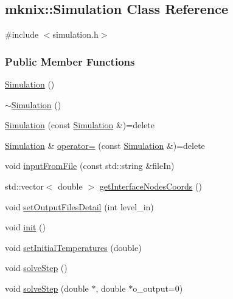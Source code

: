 \hypertarget{classmknix_1_1_simulation}{}\subsection{mknix\+:\+:Simulation Class Reference}
\label{classmknix_1_1_simulation}


{\ttfamily \#include $<$simulation.\+h$>$}

\subsubsection*{Public Member Functions}
\begin{DoxyCompactItemize}
\item 
\hyperlink{classmknix_1_1_simulation_a8741379faa5cd9695a9dc4f9be3fdc11}{Simulation} ()
\item 
\hyperlink{classmknix_1_1_simulation_a8ab58ea5b4557c72b2a8f00cb8ef3e75}{$\sim$\+Simulation} ()
\item 
\hyperlink{classmknix_1_1_simulation_a1cc519c483f9daf0beb92a2fdf2e6066}{Simulation} (const \hyperlink{classmknix_1_1_simulation}{Simulation} \&)=delete
\item 
\hyperlink{classmknix_1_1_simulation}{Simulation} \& \hyperlink{classmknix_1_1_simulation_ae91beee48577801b40aabb3a766c9241}{operator=} (const \hyperlink{classmknix_1_1_simulation}{Simulation} \&)=delete
\item 
void \hyperlink{classmknix_1_1_simulation_a7a8132d3b1ac9f76442d431c636966e3}{input\+From\+File} (const std\+::string \&file\+In)
\item 
std\+::vector$<$ double $>$ \hyperlink{classmknix_1_1_simulation_a8a1ec3f1fa00838227369275a84731b7}{get\+Interface\+Nodes\+Coords} ()
\item 
void \hyperlink{classmknix_1_1_simulation_aeae831a38892e87b1add5dbede75d722}{set\+Output\+Files\+Detail} (int level\+\_\+in)
\item 
void \hyperlink{classmknix_1_1_simulation_aee8cfa0690d96d6518454a98a46da4ed}{init} ()
\item 
void \hyperlink{classmknix_1_1_simulation_aac2f26ea6f05c6ed655b509556423148}{set\+Initial\+Temperatures} (double)
\item 
void \hyperlink{classmknix_1_1_simulation_ab714dac2d0cc8c322ffb89b51d830c1d}{solve\+Step} ()
\item 
void \hyperlink{classmknix_1_1_simulation_a248cf1daeb2fc8c2b78a5185cfd0c49c}{solve\+Step} (double $\ast$, double $\ast$o\+\_\+output=0)

\end{DoxyCompactItemize}
